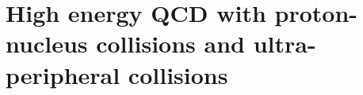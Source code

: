 \documentclass[../report.tex]{subfiles}
\begin{document}
\section{High energy QCD with proton-nucleus collisions and ultra-peripheral collisions}

\label{sec:smallx}







\end{document}
